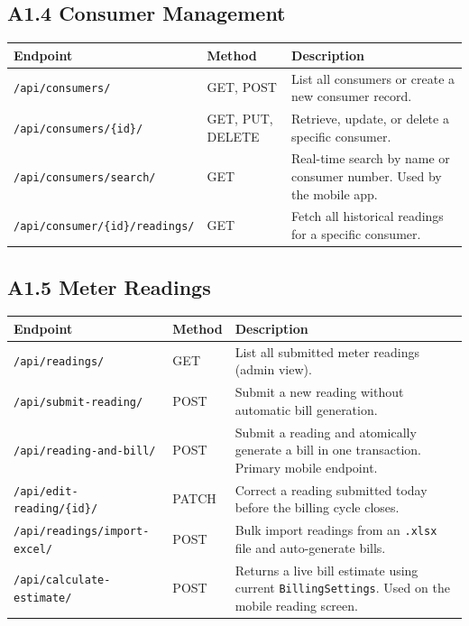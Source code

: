 \documentclass[12pt, a4paper, onecolumn]{report}
\begin{document}
\vspace{0.8em}
\subsection*{A1.4 Consumer Management}
\begin{tabularx}{\textwidth}{|p{5.2cm}|p{2.2cm}|X|}
\hline
\textbf{Endpoint} & \textbf{Method} & \textbf{Description} \\
\hline
\texttt{/api/consumers/} & GET, POST & List all consumers or create a new consumer record. \\
\hline
\texttt{/api/consumers/\{id\}/} & GET, PUT, DELETE & Retrieve, update, or delete a specific consumer. \\
\hline
\texttt{/api/consumers/search/} & GET & Real-time search by name or consumer number. Used by the mobile app. \\
\hline
\texttt{/api/consumer/\{id\}/readings/} & GET & Fetch all historical readings for a specific consumer. \\
\hline
\end{tabularx}

\vspace{0.8em}
\subsection*{A1.5 Meter Readings}
\begin{tabularx}{\textwidth}{|p{5.2cm}|p{2.2cm}|X|}
\hline
\textbf{Endpoint} & \textbf{Method} & \textbf{Description} \\
\hline
\texttt{/api/readings/} & GET & List all submitted meter readings (admin view). \\
\hline
\texttt{/api/submit-reading/} & POST & Submit a new reading without automatic bill generation. \\
\hline
\texttt{/api/reading-and-bill/} & POST & Submit a reading and atomically generate a bill in one transaction. Primary mobile endpoint. \\
\hline
\texttt{/api/edit-reading/\{id\}/} & PATCH & Correct a reading submitted today before the billing cycle closes. \\
\hline
\texttt{/api/readings/import-excel/} & POST & Bulk import readings from an \texttt{.xlsx} file and auto-generate bills. \\
\hline
\texttt{/api/calculate-estimate/} & POST & Returns a live bill estimate using current \texttt{BillingSettings}. Used on the mobile reading screen. \\
\hline
\end{tabularx}
\end{document}
